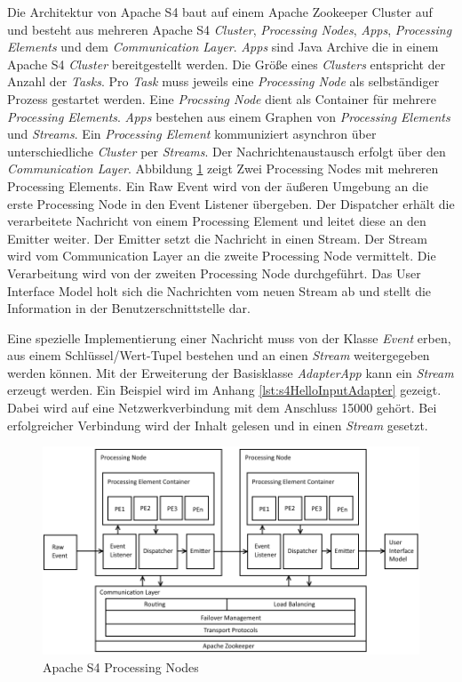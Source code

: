 Die Architektur von Apache S4 baut auf einem Apache Zookeeper Cluster auf und besteht aus mehreren Apache S4 \textit{Cluster}, \textit{Processing Nodes}, \textit{Apps}, \textit{Processing Elements} und dem \textit{Communication Layer}. \textit{Apps} sind Java Archive die in einem Apache S4 \textit{Cluster} bereitgestellt werden. Die Größe eines \textit{Clusters} entspricht der Anzahl der \textit{Tasks}. Pro \textit{Task} muss jeweils eine \textit{Processing Node} als selbständiger Prozess gestartet werden. Eine \textit{Procssing Node} dient als Container für mehrere \textit{Processing Elements}. \textit{Apps} bestehen aus einem Graphen von \textit{Processing Elements} und \textit{Streams}. Ein \textit{Processing Element} kommuniziert asynchron über unterschiedliche \textit{Cluster} per \textit{Streams}. Der Nachrichtenaustausch erfolgt über den \textit{Communication Layer}. Abbildung \ref{fig:s4ProcessingNode} zeigt Zwei Processing Nodes mit mehreren Processing Elements. Ein Raw Event wird von der äußeren Umgebung an die erste Processing Node in den Event Listener übergeben. Der Dispatcher erhält die verarbeitete Nachricht von einem Processing Element und leitet diese an den Emitter weiter. Der Emitter setzt die Nachricht in einen Stream. Der Stream wird vom Communication Layer an die zweite Processing Node vermittelt. Die Verarbeitung wird von der zweiten Processing Node durchgeführt. Das User Interface Model holt sich die Nachrichten vom neuen Stream ab und stellt die Information in der Benutzerschnittstelle dar.

Eine spezielle Implementierung einer Nachricht muss von der Klasse \textit{Event} erben, aus einem Schlüssel/Wert-Tupel bestehen und an einen \textit{Stream} weitergegeben werden können. Mit der Erweiterung der Basisklasse \textit{AdapterApp} kann ein \textit{Stream} erzeugt werden. Ein Beispiel wird im Anhang \ref{lst:s4HelloInputAdapter} gezeigt. Dabei wird auf eine Netzwerkverbindung mit dem Anschluss 15000 gehört. Bei erfolgreicher Verbindung wird der Inhalt gelesen und in einen \textit{Stream} gesetzt. 

\begin{figure}[htb!]
\centering
\includegraphics[width=1.0\textwidth]{bilder/s4ProcessingNodes.png}
\caption{Apache S4 Processing Nodes
\label{fig:s4ProcessingNode}}
\end{figure}

